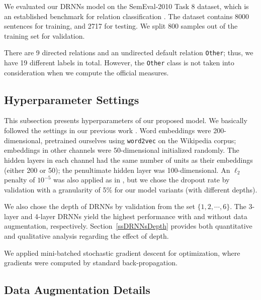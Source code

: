 \documentclass[11pt]{article}
\begin{document}
We evaluated our DRNNs model on the SemEval-2010 Task 8 dataset, which is an established benchmark for relation classification \cite{2010SVM}. The dataset contains 8000 sentences for training, and 2717 for testing. We split 800 samples out of the training set for validation.

There are 9 directed relations and an undirected default relation \verb|Other|; thus, we have 19 different labels in total. However, the \verb|Other| class is not taken into consideration when we compute the official measures.

\subsection{Hyperparameter Settings}\label{ssSetting}



This subsection presents hyperparameters of our proposed model.
We basically followed the settings in our previous work \cite{SDP-LSTM}.
Word embeddings were 200-dimensional, pretrained ourselves using {\tt word2vec} \cite{Word2vce} on the Wikipedia corpus; embeddings in other channels were 50-dimensional initialized randomly.
The hidden layers in each channel had the same number of units as their embeddings (either 200 or 50); the penultimate hidden layer was 100-dimensional. An $\ell_2$ penalty of  $10^{-5}$ was also applied as in , but we chose the dropout rate by validation with a granularity of 5\% for our model variants (with different depths).


We also chose the depth of DRNNs by validation from the set $\{1,2,\cdots,6\}$. The 3-layer and  4-layer DRNNs yield the highest performance with and without data augmentation, respectively. Section~\ref{ssDRNNsDepth} provides both quantitative and qualitative analysis regarding the effect of depth.


We applied mini-batched stochastic gradient descent for optimization, where gradients were computed by standard back-propagation.

\subsection{Data Augmentation Details}\label{ssExpDataAug}
\end{document}
